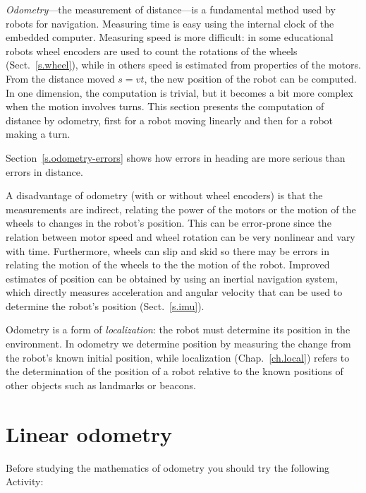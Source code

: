 \emph{Odometry}---the measurement of distance---is a fundamental method used by robots for navigation. Measuring time is easy using the internal clock of the embedded computer. Measuring speed is more difficult: in some educational robots wheel encoders are used to count the rotations of the wheels (Sect.~\ref{s.wheel}), while in others speed is estimated from properties of the motors. From the distance moved $s=vt$, the new position of the robot can be computed. In one dimension, the computation is trivial, but it becomes a bit more complex when the motion involves turns. This section presents the computation of distance by odometry, first for a robot moving linearly and then for a robot making a turn.

Section~\ref{s.odometry-errors} shows how errors in heading are more serious than errors in distance.

A disadvantage of odometry (with or without wheel encoders) is that the measurements are indirect, relating the power of the motors or the motion of the wheels to changes in the robot's position. This can be error-prone since the relation between motor speed and wheel rotation can be very nonlinear and vary with time. Furthermore, wheels can slip and skid so there may be errors in relating the motion of the wheels to the the motion of the robot. Improved estimates of position can be obtained by using an inertial navigation system, which directly measures acceleration and angular velocity that can be used to determine the robot's position (Sect.~\ref{s.imu}).

Odometry is a form of \emph{localization}: the robot must determine its position in the environment. In odometry we determine position by measuring the change from the robot's known initial position, while localization (Chap.~\ref{ch.local}) refers to the determination of the position of a robot relative to the known positions of other objects such as landmarks or beacons.


\section{Linear odometry}

Before studying the mathematics of odometry you should try the following Activity:

